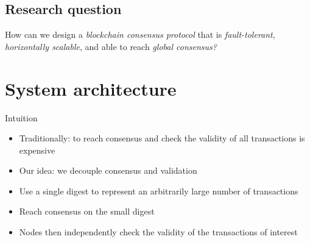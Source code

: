 \documentclass{beamer}
\begin{document}
\subsection{Research question}
\begin{frame}{\subsecname}
  \begin{block}{}
    \Large{
    How can we design a \emph{blockchain consensus protocol} that is \emph{fault-tolerant},
    \emph{horizontally scalable}, and able to reach \emph{global consensus?}
    }
  \end{block}
\end{frame}

\section{System architecture}
\begin{frame}{Intuition}
  \begin{itemize}
    \item Traditionally: to reach consensus and check the validity of all transactions is expensive
    \item Our idea: we decouple consensus and validation
    \item Use a single digest to represent an arbitrarily large number of transactions
    \item Reach consensus on the small digest
    \item Nodes then independently check the validity of the transactions of interest
  \end{itemize}
\end{frame}
\end{document}
